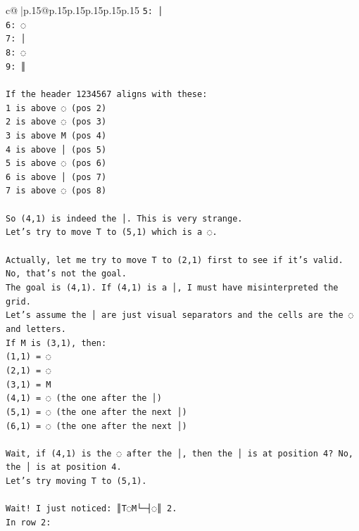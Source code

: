 \documentclass{article}
\begin{document}
{\begin{supertabular}{c@{$\;$}|p{.15\linewidth}@{}p{.15\linewidth}p{.15\linewidth}p{.15\linewidth}p{.15\linewidth}p{.15\linewidth}}
{{{\texttt{5: │} \\
\texttt{6: ◌} \\
\texttt{7: │} \\
\texttt{8: ◌} \\
\texttt{9: ║} \\
\\ 
\texttt{If the header 1234567 aligns with these:} \\
\texttt{1 is above ◌ (pos 2)} \\
\texttt{2 is above ◌ (pos 3)} \\
\texttt{3 is above M (pos 4)} \\
\texttt{4 is above │ (pos 5)} \\
\texttt{5 is above ◌ (pos 6)} \\
\texttt{6 is above │ (pos 7)} \\
\texttt{7 is above ◌ (pos 8)} \\
\\ 
\texttt{So (4,1) is indeed the │. This is very strange.} \\
\texttt{Let's try to move T to (5,1) which is a ◌.} \\
\\ 
\texttt{Actually, let me try to move T to (2,1) first to see if it's valid. No, that's not the goal.} \\
\texttt{The goal is (4,1). If (4,1) is a │, I must have misinterpreted the grid.} \\
\texttt{Let's assume the │ are just visual separators and the cells are the ◌ and letters.} \\
\texttt{If M is (3,1), then:} \\
\texttt{(1,1) = ◌} \\
\texttt{(2,1) = ◌} \\
\texttt{(3,1) = M} \\
\texttt{(4,1) = ◌ (the one after the │)} \\
\texttt{(5,1) = ◌ (the one after the next │)} \\
\texttt{(6,1) = ◌ (the one after the next │)} \\
\\ 
\texttt{Wait, if (4,1) is the ◌ after the │, then the │ is at position 4? No, the │ is at position 4.} \\
\texttt{Let's try moving T to (5,1).} \\
\\ 
\texttt{Wait! I just noticed: ║T◌M└─┤◌║ 2.} \\
\texttt{In row 2:} \\
}}}
\end{supertabular}}
\end{document}
